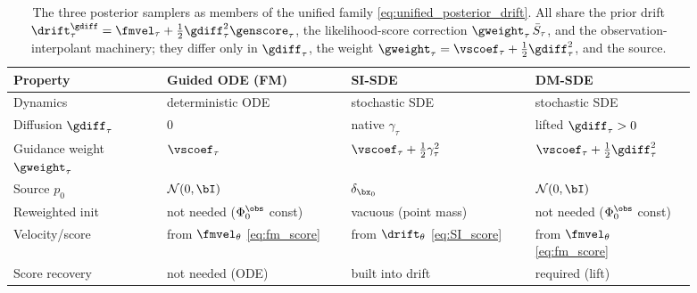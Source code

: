 \begin{table}[ht]
    \centering
    \caption{The three posterior samplers as members of the unified family \eqref{eq:unified_posterior_drift}. All share the prior drift $\drift^{\gdiff}_\tau=\fmvel_\tau+\tfrac12\gdiff_\tau^2\genscore_\tau$, the likelihood-score correction $\gweight_\tau\,\bar S_\tau$, and the observation-interpolant machinery; they differ only in $\gdiff_\tau$, the weight $\gweight_\tau=\vscoef_\tau+\tfrac12\gdiff_\tau^2$, and the source.}
    \label{tab:samplers}
    \small
    \begin{tabular}{p{0.2\linewidth}|p{0.24\linewidth}|p{0.24\linewidth}|p{0.21\linewidth}}
        \toprule
        \textbf{Property} & \textbf{Guided ODE (FM)} & \textbf{SI-SDE} & \textbf{DM-SDE} \\
        \midrule
        Dynamics & deterministic ODE & stochastic SDE & stochastic SDE \\
        Diffusion $\gdiff_\tau$ & $0$ & native $\gamma_\tau$ & lifted $\gdiff_\tau>0$ \\
        Guidance weight $\gweight_\tau$ & $\vscoef_\tau$ & $\vscoef_\tau+\tfrac12\gamma_\tau^2$ & $\vscoef_\tau+\tfrac12\gdiff_\tau^2$ \\
        Source $p_0$ & $\mathcal{N}(0,\bI)$ & $\delta_{\bx_0}$ & $\mathcal{N}(0,\bI)$ \\
        Reweighted init & not needed ($\Phi_0^{\obs}$ const) & vacuous (point mass) & not needed ($\Phi_0^{\obs}$ const) \\
        Velocity/score & from $\fmvel_\theta$ \eqref{eq:fm_score} & from $\drift_\theta$ \eqref{eq:SI_score} & from $\fmvel_\theta$ \eqref{eq:fm_score} \\
        Score recovery & not needed (ODE) & built into drift & required (lift) \\
        \bottomrule
    \end{tabular}
\end{table}




